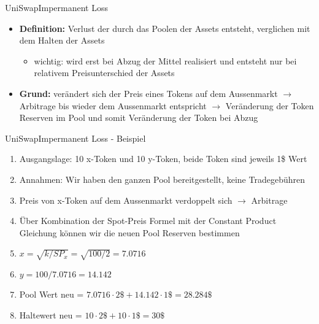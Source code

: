 \documentclass{beamer}
\begin{document}
\begin{frame}{UniSwap}{Impermanent Loss}
 \begin{itemize}
    \item<1->{\textbf{Definition:} Verlust der durch das Poolen der Assets entsteht, verglichen mit dem Halten der Assets}
    \begin{itemize}
    \item{wichtig: wird erst bei Abzug der Mittel realisiert und entsteht nur bei relativem Preisunterschied der Assets}
    \end{itemize}
   \vspace{1em}
    \item<2->{\textbf{Grund:} verändert sich der Preis eines Tokens auf dem Aussenmarkt $\rightarrow$ Arbitrage bis wieder dem Aussenmarkt entspricht
    $\rightarrow$ Veränderung der Token Reserven im Pool und somit Veränderung der Token bei Abzug}
  \end{itemize} 	
\end{frame}

\begin{frame}{UniSwap}{Impermanent Loss - Beispiel}
 \begin{enumerate}
    \item<1->{Ausgangslage: 10 x-Token und 10 y-Token, beide Token sind jeweils 1\$ Wert}
    \item<2->{Annahmen: Wir haben den ganzen Pool bereitgestellt, keine Tradegebühren}
    \item<3->{Preis von x-Token auf dem Aussenmarkt verdoppelt sich $\rightarrow$ Arbitrage}
    \item<4->{Über Kombination der Spot-Preis Formel mit der Constant Product Gleichung können wir die neuen Pool Reserven bestimmen}
    \item<5->${x=\sqrt{k/SP_{x}} = \sqrt{100/2} = 7.0716}$
    \item<6->${y=100/7.0716 = 14.142}$
    \item<7->{Pool Wert neu = $7.0716 \cdot 2\$ + 14.142 \cdot 1\$ = 28.284 \$ $}
    \item<8->{Haltewert neu = $ 10 \cdot 2\$ + 10 \cdot 1\$ = 30\$ $}
  \end{enumerate}	
\end{frame}
\end{document}
